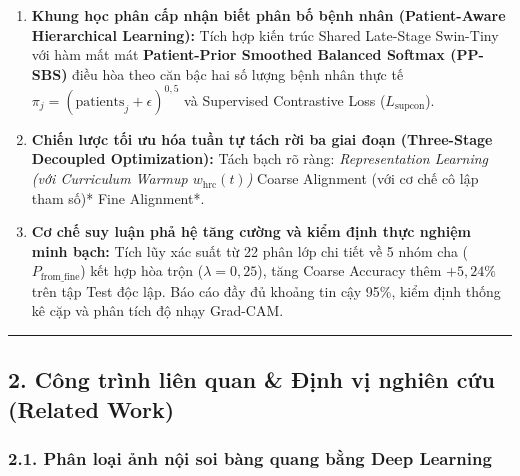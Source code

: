 \documentclass[
  11pt,
  a4paper,
]{article}
\providecommand{\tightlist}{%
  \setlength{\itemsep}{0pt}\setlength{\parskip}{0pt}}
\begin{document}
\begin{enumerate}
\def\labelenumi{\arabic{enumi}.}
\tightlist
\item
  \textbf{Khung học phân cấp nhận biết phân bố bệnh nhân (Patient-Aware
  Hierarchical Learning):} Tích hợp kiến trúc Shared Late-Stage
  Swin-Tiny với hàm mất mát \textbf{Patient-Prior Smoothed Balanced
  Softmax (PP-SBS)} điều hòa theo căn bậc hai số lượng bệnh nhân thực tế
  \(\pi_j = (\text{patients}_j + \epsilon)^{0{,}5}\) và Supervised
  Contrastive Loss (\(L_{\text{supcon}}\)).
\item
  \textbf{Chiến lược tối ưu hóa tuần tự tách rời ba giai đoạn
  (Three-Stage Decoupled Optimization):} Tách bạch rõ ràng:
  \emph{Representation Learning (với Curriculum Warmup
  \(w_{\text{hrc}}(t)\))} \rightarrow *Coarse Alignment (với cơ chế cô
  lập tham số)* \rightarrow *Fine Alignment*.
\item
  \textbf{Cơ chế suy luận phả hệ tăng cường và kiểm định thực nghiệm
  minh bạch:} Tích lũy xác suất từ 22 phân lớp chi tiết về 5 nhóm cha
  (\(P_{\text{from\_fine}}\)) kết hợp hòa trộn (\(\lambda=0{,}25\)),
  tăng Coarse Accuracy thêm \(+5{,}24\%\) trên tập Test độc lập. Báo cáo
  đầy đủ khoảng tin cậy 95\%, kiểm định thống kê cặp và phân tích độ
  nhạy Grad-CAM.
\end{enumerate}

\begin{center}\rule{0.5\linewidth}{0.5pt}\end{center}

\subsection{2. Công trình liên quan \& Định vị nghiên cứu (Related
Work)}\label{cuxf4ng-truxecnh-liuxean-quan-ux111ux1ecbnh-vux1ecb-nghiuxean-cux1ee9u-related-work}

\subsubsection{2.1. Phân loại ảnh nội soi bàng quang bằng Deep
Learning}\label{phuxe2n-loux1ea1i-ux1ea3nh-nux1ed9i-soi-buxe0ng-quang-bux1eb1ng-deep-learning}
\end{document}
